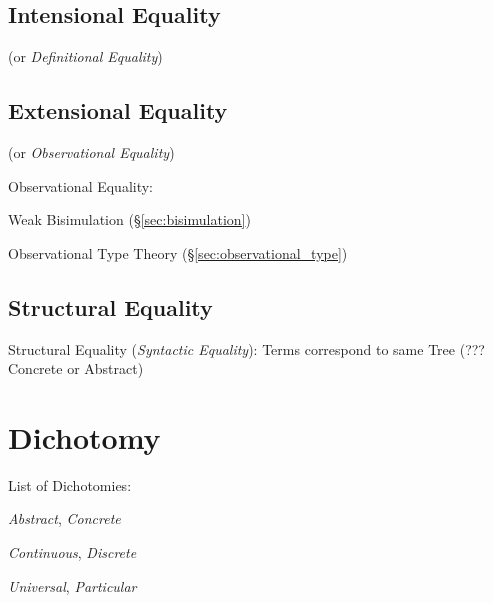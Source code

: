 \subsection{Intensional Equality}\label{sec:intensional_equality}

(or \emph{Definitional Equality})



\subsection{Extensional Equality}\label{sec:extensional_equality}

(or \emph{Observational Equality})

Observational Equality: %

Weak Bisimulation (\S\ref{sec:bisimulation})

Observational Type Theory (\S\ref{sec:observational_type})



\subsection{Structural Equality}\label{sec:structural_equality}

Structural Equality (\emph{Syntactic Equality}): Terms correspond to
same Tree (??? Concrete or Abstract)



\section{Dichotomy}\label{sec:dichotomy}

List of Dichotomies:

\emph{Abstract}, \emph{Concrete}

\emph{Continuous}, \emph{Discrete} %

\emph{Universal}, \emph{Particular}

